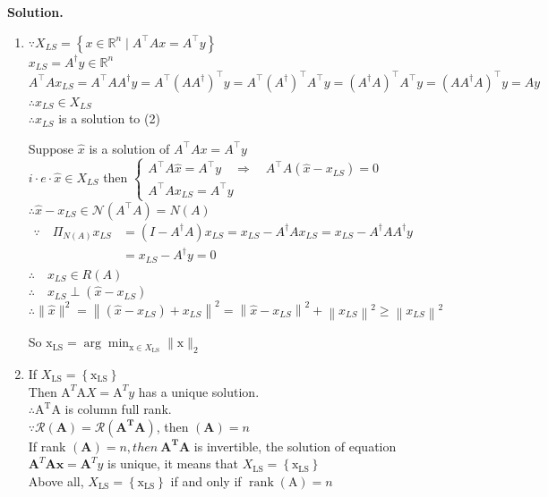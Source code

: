 \documentclass[english,onecolumn]{IEEEtran}
\begin{document}
\noindent
\textbf{Solution.}
\begin{enumerate}
\item
$\because X_{L S}=\left\{x \in \mathbb{R}^{n} \mid A^{\top} A x=A^{\top} y\right\}$\\
$x_{L S}=A^{\dagger} y \in \mathbb{R}^{n}$\\
$A^{\top} A x_{L S}=A^{\top} A A^{\dagger} y=A^{\top}\left(A A^{\dagger}\right)^{\top} y=A^{\top}\left(A^{\dagger}\right)^{\top} A^{\top} y=\left(A^{\dagger} A\right)^{\top} A^{\top} y=\left(A A^{\dagger} A\right)^{\top} y=A y$\\
$\therefore x_{L S} \in X_{L S}$\\
$\therefore x_{L S}$ is a solution to (2)

Suppose $\hat{x}$ is a solution of $A^{\top} A x=A^{\top} y$\\
$i \cdot e \cdot \hat{x} \in X_{L S}$
then $\left\{\begin{array}{l}A^{\top} A \hat{x}=A^{\top} y \quad \Rightarrow \quad A^{\top} A\left(\hat{x}-x_{L S}\right)=0 \\ A^{\top} A x_{L S}=A^{\top} y\end{array}\right.$\\
$\therefore \hat{x}-x_{L S} \in \mathcal{N}\left(A^{\top} A\right)=N(A)$\\
$\begin{aligned} \because \quad \Pi_{N(A)} x_{L S} &=\left(I-A^{\dagger} A\right) x_{L S}=x_{L S}-A^{\dagger} A x_{L S}=x_{L S}-A^{\dagger} A A^{\dagger} y \\ &=x_{L S}-A^{\dagger} y=0 \end{aligned}$\\
$\therefore \quad x_{L S} \in R(A)$\\
$\therefore \quad x_{L S} \perp (\hat{x}-x_{L S})$\\
$\therefore\|\hat{x}\|^{2}=\left\|\left(\hat{x}-x_{L S}\right)+x_{L S}\right\|^{2}=\left\|\hat{x}-x_{L S}\right\|^{2}+\left\|x_{L S}\right\|^{2} \geqslant\left\|x_{L S}\right\|^{2}$


So $\mathrm{x}_{\mathrm{LS}}=\arg \min _{\mathrm{x} \in X_{\mathrm{LS}}}\|\mathrm{x}\|_{2}$

\item
If $X_{\mathrm{LS}}=\left\{\mathrm{x}_{\mathrm{LS}}\right\}$\\
Then $\mathrm{A}^{T} \mathrm{A} X=\mathrm{A}^{T} y$ has a unique solution. \\
$\therefore \mathrm{A}^{\mathrm{T}} \mathrm{A}$ is column full rank.\\
$\because \mathcal{R}(\mathbf{A})=\mathcal{R}\left(\mathbf{A}^{\mathbf{T}} \mathbf{A}\right)$, then $(\mathbf{A})=n$\\
If rank $(\mathbf{A})=n, then \ \mathbf{A}^{\mathbf{T}} \mathbf{A}$ is invertible, the solution of equation $\mathbf{A}^{T} \mathbf{A} \mathbf x=\mathbf{A}^{T} y$ is unique, it means that $X_{\mathrm{LS}}=\left\{\mathrm{x}_{\mathrm{LS}}\right\}$\\
Above all, $X_{\mathrm{LS}}=\left\{\mathrm{x}_{\mathrm{LS}}\right\}$ if and only if $\operatorname{rank}(\mathrm{A})=n$


\end{enumerate}
\end{document}

